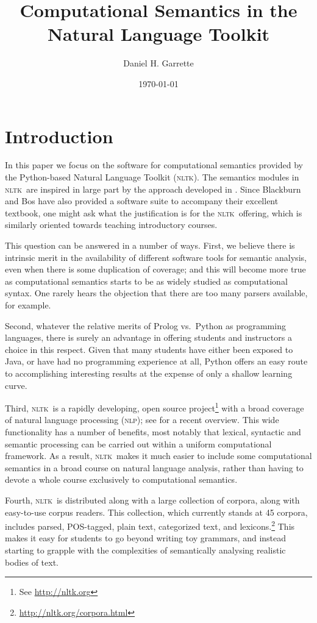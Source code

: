 \documentclass[11pt,a4paper]{article}
\newcommand{\NLP}{\textsc{nlp}}
\newcommand{\NLTK}{\textsc{nltk}}
\begin{document}
\title{Computational Semantics in the Natural Language Toolkit}
\author{Daniel H. Garrette}
\date{\today}
\maketitle

\section{Introduction}

In this paper we focus on the software for computational semantics provided
by the Python-based Natural Language Toolkit (\NLTK). The semantics
modules in \NLTK\ are
inspired in large part by the approach developed in \citet{BB}.
Since Blackburn and Bos have also provided a software suite to
accompany their excellent textbook, one might ask what the
justification is for the \NLTK\ offering, which is similarly oriented
towards teaching introductory courses.

This question can be answered in a number of ways. First, we believe
there is intrinsic merit in the availability of different
software tools for semantic analysis, even when there is some
duplication of coverage; and this will become more true as
computational semantics starts to be as widely studied as computational
syntax. One rarely hears the objection that there are too many
parsers available, for example. 

Second, whatever the relative merits of Prolog vs.\ Python as
programming languages, there is surely an advantage in offering
students and instructors a choice in this respect. Given that many
students have either been exposed to Java, or have had no programming
experience at all, Python offers an easy route to accomplishing
interesting results at the expense of only a shallow learning curve.

Third, \NLTK\ is a rapidly developing, open source
project\footnote{See \url{http://nltk.org}} with a broad coverage of
natural language processing (\NLP); see \citet{Multidisciplinary} for
a recent overview. This wide functionality has a number of benefits,
most notably that lexical, syntactic and semantic processing can be
carried out within a uniform computational framework. As a result,
\NLTK\ makes it much easier to include some computational semantics in
a broad course on natural language analysis, rather than having to
devote a whole course exclusively to computational semantics.

Fourth, \NLTK\ is distributed along with a
large collection of corpora, along with easy-to-use corpus readers.
This collection, which currently stands at 45 corpora, includes
parsed, POS-tagged, plain text, categorized text, and
lexicons.\footnote{\url{http://nltk.org/corpora.html}} This makes it
easy for students to go beyond writing toy grammars, and instead
starting to grapple with the complexities of semantically analysing
realistic bodies of text.
\end{document}
